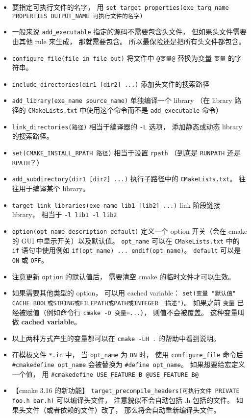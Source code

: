 \begin{itemize}
\item 要指定可执行文件的名字， 用 \verb`set_target_properties(exe_targ_name PROPERTIES OUTPUT_NAME 可执行文件的名字)`
\item 一般来说 \verb`add_executable` 指定的源码不需要包含头文件， 但如果头文件需要由其他 rule 来生成， 那就需要包含。 所以最保险还是把所有头文件都包含。
\item \verb`configure_file(file_in file_out)` 将文件中 \verb`@变量@` 替换为变量 \verb`变量` 的字符串。
\item \verb`include_directories(dir1 [dir2] ...)` 添加头文件的搜索路径
\item \verb`add_library(exe_name source_name)` 单独编译一个 library （在 library 路径的 \verb`CMakeLists.txt` 中使用这个命令而不是 \verb`add_executable` 命令）
\item \verb`link_directories(路径)` 相当于编译器的 \verb`-L` 选项， 添加静态或动态 library 的搜索路径。
\item \verb`set(CMAKE_INSTALL_RPATH 路径)` 相当于设置 \verb`rpath` （到底是 \verb`RUNPATH` 还是 \verb`RPATH`？）
\item \verb`add_subdirectory(dir1 [dir2] ...)` 执行子路径中的 \verb`CMakeLists.txt`。 往往用于编译某个 library。
\item \verb`target_link_libraries(exe_name lib1 [lib2] ...)` link 阶段链接 library， 相当于 \verb`-l lib1 -l lib2`
\item \verb`option(opt_name description default)` 定义一个 option 开关（会在 cmake 的 GUI 中显示开关）以及默认值。 \verb`opt_name` 可以在 \verb`CMakeLists.txt` 中的 \verb`if` 语句中使用例如 \verb`if(opt_name) ... endif(opt_name)`。 \verb`default` 可以是 \verb`ON` 或 \verb`OFF`。
\item 注意更新 \verb`option` 的默认值后， 需要清空 cmake 的临时文件才可以生效。
\item 如果需要其他类型的 option， 可以用 cached variable： \verb`set(变量 "默认值" CACHE BOOL或STRING或FILEPATH或PATH或INTEGER "描述")`。 如果之前 \verb`变量` 已经被赋值（例如命令行 \verb`cmake -D 变量=...`）， 则值不会被覆盖。 这种变量叫做 \textbf{cached variable}。
\item 以上两种方式产生的变量都可以在 \verb`cmake -LH .` 的帮助中看到说明。
\item 在模板文件 \verb`*.in` 中， 当 \verb`opt_name` 为 \verb`ON` 时， 使用 \verb`configure_file` 命令后 \verb`#cmakedefine opt_name` 会被替换为 \verb`#define opt_name`。 如果想要给宏定义一个值， 用 \verb`#cmakedefine USE_FEATURE_B @USE_FEATURE_B@`
\item 【cmake 3.16 的新功能】 \verb`target_precompile_headers(可执行文件 PRIVATE foo.h bar.h)` 可以编译头文件， 注意貌似不会自动包括 .h 包括的文件。 如果头文件（或者依赖的文件）改了， 那么将会自动重新编译头文件。

\end{itemize}
